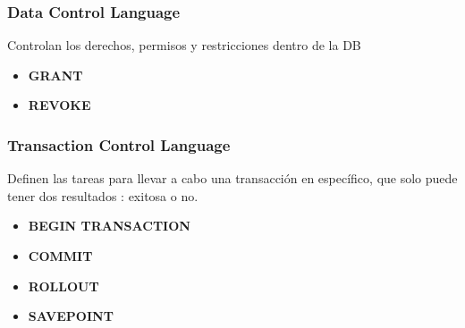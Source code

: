\subsubsection{Data Control Language}
Controlan los derechos, permisos y restricciones dentro de la DB
\begin{itemize}
    \item {\textbf{GRANT}}
    \item {\textbf{REVOKE}}
\end{itemize}

\subsubsection{Transaction Control Language}
Definen las tareas para llevar a cabo una transacción en específico, que solo puede tener dos resultados : exitosa o no. 
\begin{itemize}
    \item {\textbf{BEGIN TRANSACTION}}
    \item {\textbf{COMMIT}}
    \item {\textbf{ROLLOUT}}
    \item {\textbf{SAVEPOINT}}
\end{itemize}


